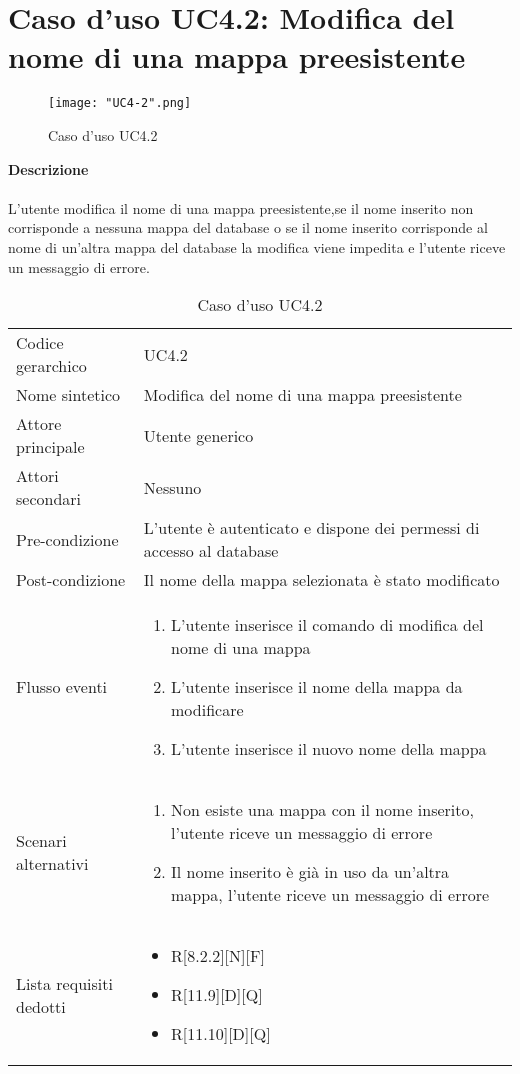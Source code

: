 \documentclass[a4paper]{report}
\begin{document}
	  \section{Caso d'uso UC4.2: Modifica del nome di una mappa preesistente}
	 \begin{figure}[H]
			\centering
			\texttt{[image: "UC4-2".png]}
			\caption{Caso d'uso UC4.2}
		\end{figure}
	 \textbf{Descrizione} \\ \\
	 L'utente modifica il nome di una mappa preesistente,se il nome inserito non corrisponde a nessuna
	 mappa del database o se il nome inserito corrisponde al nome di un'altra mappa del database la
	 modifica viene impedita e l'utente riceve un messaggio di errore.
		\begin{table}[H]
		\begin{tabularx}{\textwidth}{X | X}\toprule
			\rowcolor{orange!65}Codice gerarchico & UC4.2 \\
			Nome sintetico & Modifica del nome di una mappa preesistente \\
			\rowcolor{orange!65}Attore principale & Utente generico\\
			Attori secondari & Nessuno \\
			\rowcolor{orange!65}Pre-condizione & L'utente è autenticato e dispone dei permessi di accesso
			al database\\
			Post-condizione & Il nome della mappa selezionata è stato modificato\\
			\rowcolor{orange!65}Flusso eventi & \begin{enumerate}
			\item L'utente inserisce il comando di modifica del nome di una mappa
			\item L'utente inserisce il nome della mappa da modificare
			\item L'utente inserisce il nuovo nome della mappa
			\end{enumerate} \\
			Scenari alternativi & \begin{enumerate}
			\item Non esiste una mappa con il nome inserito, l'utente riceve un messaggio di errore
			\item Il nome inserito è già in uso da un'altra mappa, l'utente riceve un messaggio di errore
			\end{enumerate} \\
			\rowcolor{orange!65}Lista requisiti dedotti & \begin{itemize}
				\item R[8.2.2][N][F]
				\item R[11.9][D][Q]
				\item R[11.10][D][Q]
				\end{itemize} \\
			\bottomrule
		\end{tabularx}
		\caption{Caso d'uso UC4.2}
	 \end{table}
\end{document}
